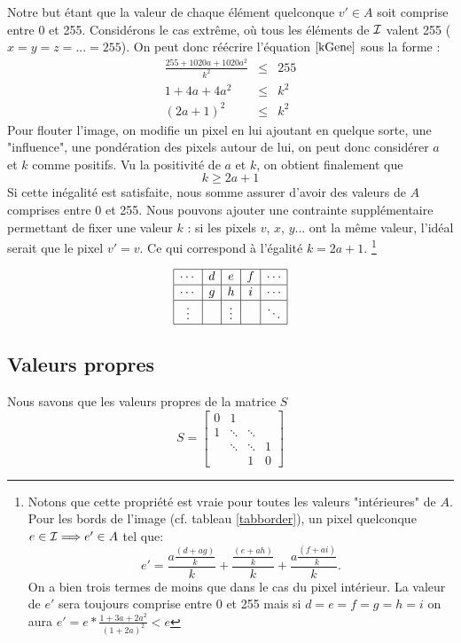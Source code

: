 Notre but étant que la valeur de chaque élément quelconque $v' \in A$	soit comprise entre 0 et 255. 
Considérons le cas extrême, où tous les éléments de $\mathcal{I}$ valent 255 ($x=y=z=...=255$).
On peut donc réécrire l'équation $\ref{kGene}$ sous la forme :
\begin{eqnarray}
\frac{255+1020a+1020a^2}{k^2} &\leq & 255 \\
1+4a+4a^2 &\leq & k^2 \\
(2a+1)^2 &\leq & k^2
\end{eqnarray}
Pour flouter l'image, on modifie un pixel en lui ajoutant en quelque sorte, une "influence", une pondération des pixels autour de lui, on peut donc considérer $a$ et $k$ comme positifs.  
Vu la positivité de $a$ et $k$, on obtient finalement que
\begin{equation}
k \geq 2a+1
\end{equation}
Si cette inégalité est satisfaite, nous somme assurer d'avoir des valeurs de $A$ comprises entre 0 et 255. Nous  pouvons ajouter une contrainte supplémentaire permettant de fixer une valeur $k$ : si les pixels $v$, $x$, $y$... ont la même valeur, l'idéal serait que le pixel $v'=v$. Ce qui correspond à l'égalité $k=2a+1$. \footnote{Notons que cette propriété est vraie pour toutes les valeurs "intérieures" de $A$. Pour les bords de l'image (cf. tableau \ref{tabborder}), un pixel quelconque $e \in \mathcal{I} \Longrightarrow e' \in A$ tel que:  
$$e' = \frac{a \frac{(d+ag)}{k}}{k} + \frac{ \frac{(e+ah)}{k}}{k} + \frac{a \frac{(f+ai)}{k}}{k} . $$ On a bien trois termes de moins que dans le cas du pixel intérieur. La valeur de $e'$ sera toujours comprise entre 0 et 255 mais si $d=e=f=g=h=i$ on aura $e'= e * \frac{1+3a+2a^2}{(1+2a)^2} < e$ }  

$$
\begin{array}{|c|c|c|c|c|} 
\hline
\cdots & d & e & f & \cdots\\
\hline
\cdots & g & h & i & \cdots\\
\hline
\vdots &  & \vdots &  & \ddots \\
\hline
\end{array} \label{tabborder}
$$

\subsection{Valeurs propres}
Nous savons que les valeurs propres de la matrice $S$
$$
S =
 \begin{bmatrix}
    0 & 1 		& 			& \\
    1 & \ddots 	& \ddots 	& \\
      & \ddots 	& \ddots 	& 1 \\
      & 		& 1			& 0
  \end{bmatrix}
$$

